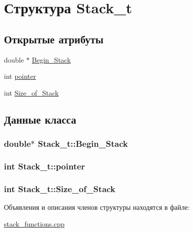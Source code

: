 \hypertarget{struct_stack__t}{
\section{Структура Stack\_\-t}
\label{struct_stack__t}
}
\subsection*{Открытые атрибуты}
\begin{DoxyCompactItemize}
\item 
double $\ast$ \hyperlink{struct_stack__t_a8ec9dee3cdfd5c5ad7f62546b48c220e}{Begin\_\-Stack}
\item 
int \hyperlink{struct_stack__t_ab804ece93d0b4b94269eda71911bd88d}{pointer}
\item 
int \hyperlink{struct_stack__t_a519bc7daae5670428bba5559eb2eb53c}{Size\_\-of\_\-Stack}
\end{DoxyCompactItemize}


\subsection{Данные класса}
\hypertarget{struct_stack__t_a8ec9dee3cdfd5c5ad7f62546b48c220e}{
\subsubsection[{Begin\_\-Stack}]{\setlength{\rightskip}{0pt plus 5cm}double$\ast$ {\bf Stack\_\-t::Begin\_\-Stack}}}
\label{struct_stack__t_a8ec9dee3cdfd5c5ad7f62546b48c220e}
\hypertarget{struct_stack__t_ab804ece93d0b4b94269eda71911bd88d}{
\subsubsection[{pointer}]{\setlength{\rightskip}{0pt plus 5cm}int {\bf Stack\_\-t::pointer}}}
\label{struct_stack__t_ab804ece93d0b4b94269eda71911bd88d}
\hypertarget{struct_stack__t_a519bc7daae5670428bba5559eb2eb53c}{
\subsubsection[{Size\_\-of\_\-Stack}]{\setlength{\rightskip}{0pt plus 5cm}int {\bf Stack\_\-t::Size\_\-of\_\-Stack}}}
\label{struct_stack__t_a519bc7daae5670428bba5559eb2eb53c}


Объявления и описания членов структуры находятся в файле:\begin{DoxyCompactItemize}
\item 
\hyperlink{stack__functions_8cpp}{stack\_\-functions.cpp}\end{DoxyCompactItemize}
